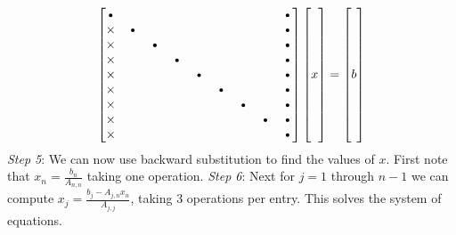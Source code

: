 \documentclass[12pt]{article}
\begin{document}
	$$
	\begin{bmatrix}
	\text{\textbullet}&&&&&&&&\text{\textbullet}\\
	\times&\text{\textbullet}&&&&&&&\text{\textbullet}\\
	\times&&\text{\textbullet}&&&&&&\text{\textbullet}\\
	\times&&&\text{\textbullet}&&&&&\text{\textbullet}\\
	\times&&&&\text{\textbullet}&&&&\text{\textbullet}\\
	\times&&&&&\text{\textbullet}&&&\text{\textbullet}\\
	\times&&&&&&\text{\textbullet}&&\text{\textbullet}\\
	\times&&&&&&&\text{\textbullet}&\text{\textbullet}\\
	\times&&&&&&&&\text{\textbullet}\\
	\end{bmatrix}\begin{bmatrix}\\ \\ \\ \\ x \\ \\ \\ \\ \\\end{bmatrix}= \begin{bmatrix}\\ \\ \\ \\ b \\ \\ \\ \\ \\\end{bmatrix}
	$$
	\emph{Step 5}: We can now use backward substitution to find the values of $x$. First note that $x_n=\tfrac{b_n}{A_{n,n}}$ taking one operation.
	\emph{Step 6}: Next for $j=1$ through $n-1$ we can compute $x_j=\tfrac{b_j-A_{j,n}x_n}{A_{j,j}}$, taking 3 operations per entry. This solves the system of equations. \bigbreak
	
\end{document}
